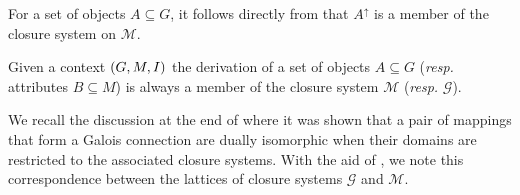 For a set of objects $A \subseteq G$, it follows directly from  that $A^{\uparrow}$ is a member of
the closure system on $\mathcal{M}$.

\begin{corollary}
	\label{corollary:derivation-closure-systems}

	Given a context $(G,M,\mathrel{I})$ the derivation of a set of objects $A \subseteq G$ (\textit{resp.} attributes $B \subseteq M$) is
	always a member of the closure system $\mathcal{M}$ (\textit{resp.} $\mathcal{G}$).
\end{corollary}

We recall the discussion at the end of  where it was shown that a pair of mappings
that form a Galois connection are dually isomorphic when their domains are restricted to the associated closure systems.
With the aid of , we note this correspondence between the lattices of closure systems
$\mathcal{G}$ and $\mathcal{M}$.


